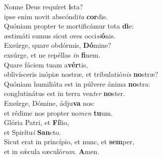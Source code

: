 \evenverse Nonne Deus requíret \textbf{i}sta?~\*\\
\evenverse ipse enim novit abscóndi\textit{ta} \textbf{cor}dis.\\
\oddverse Quóniam propter te mortificámur tota \textbf{di}e:~\*\\
\oddverse æstimáti sumus sicut oves occi\textit{si}\textbf{ó}nis.\\
\evenverse Exsúrge, quare obdórmis, \textbf{Dó}mine?~\*\\
\evenverse exsúrge, et ne repéllas \textit{in} \textbf{fi}nem.\\
\oddverse Quare fáciem tuam a\textbf{vér}tis,~\*\\
\oddverse oblivísceris inópiæ nostræ, et tribulatió\textit{nis} \textbf{no}stræ?\\
\evenverse Quóniam humiliáta est in púlvere ánima \textbf{no}stra:~\*\\
\evenverse conglutinátus est in terra ven\textit{ter} \textbf{no}ster.\\
\oddverse Exsúrge, Dómine, ádju\textbf{va} nos:~\*\\
\oddverse et rédime nos propter no\textit{men} \textbf{tu}um.\\
\evenverse Glória Patri, et \textbf{Fí}lio,~\*\\
\evenverse et Spirítu\textit{i} \textbf{San}cto.\\
\oddverse Sicut erat in princípio, et nunc, et \textbf{sem}per,~\*\\
\oddverse et in sǽcula sæculó\textit{rum}. \textbf{A}men.\\
